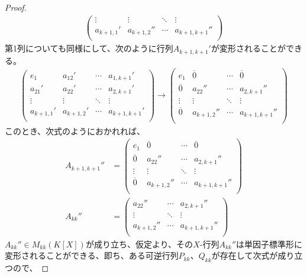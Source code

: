 \documentclass[dvipdfmx]{jsarticle}
\begin{document}
\begin{proof}
\begin{align*}
\begin{pmatrix}
 \vdots & \vdots & \ddots & \vdots \\
a_{k + 1,1}' & a_{k + 1,2}'' & \cdots & a_{k + 1,k + 1}'' \\
\end{pmatrix}
\end{align*}
第1列についても同様にして、次のように行列$A_{k + 1,k + 1}'$が変形されることができる。
\begin{align*}
\begin{pmatrix}
e_{1} & a_{12}' & \cdots & a_{1,k + 1}' \\
a_{21}' & a_{22}' & \cdots & a_{2,k + 1}' \\
 \vdots & \vdots & \ddots & \vdots \\
a_{k + 1,1}' & a_{k + 1,2}' & \cdots & a_{k + 1,k + 1}' \\
\end{pmatrix} \rightarrow \begin{pmatrix}
e_{1} & \overline{0} & \cdots & \overline{0} \\
\overline{0} & a_{22}'' & \cdots & a_{2,k + 1}'' \\
 \vdots & \vdots & \ddots & \vdots \\
\overline{0} & a_{k + 1,2}'' & \cdots & a_{k + 1,k + 1}'' \\
\end{pmatrix}
\end{align*}
このとき、次式のようにおかれれば、
\begin{align*}
A_{k + 1,k + 1}'' &= \begin{pmatrix}
e_{1} & \overline{0} & \cdots & \overline{0} \\
\overline{0} & a_{22}'' & \cdots & a_{2,k + 1}'' \\
 \vdots & \vdots & \ddots & \vdots \\
\overline{0} & a_{k + 1,2}'' & \cdots & a_{k + 1,k + 1}'' \\
\end{pmatrix}\\
A_{kk}'' &= \begin{pmatrix}
a_{22}'' & \cdots & a_{2,k + 1}'' \\
 \vdots & \ddots & \vdots \\
a_{k + 1,2}'' & \cdots & a_{k + 1,k + 1}'' \\
\end{pmatrix}
\end{align*}
$A_{kk}'' \in M_{kk}\left( K[ X] \right)$が成り立ち、仮定より、その$X$-行列$A_{kk}''$は単因子標準形に変形されることができる、即ち、ある可逆行列$P_{kk}$、$Q_{kk}$が存在して次式が成り立つので、

\end{proof}
\end{document}
